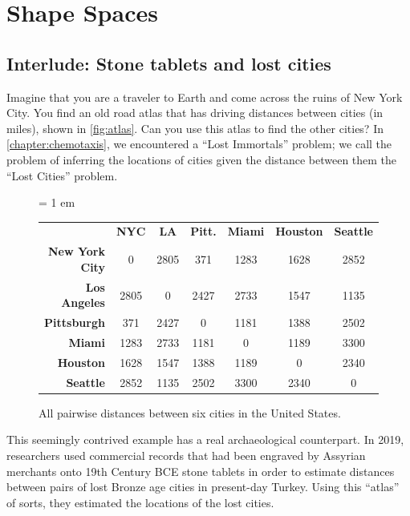 \FloatBarrier
{}

\section{Shape Spaces}
\label{sec:shape_spaces}

\subsection{Interlude: Stone tablets and lost cities}

Imagine that you are a traveler to Earth and come across the ruins of New York City. You find an old road atlas that has driving distances between cities (in miles), shown in \autoref{fig:atlas}. Can you use this atlas to find the other cities? In \autoref{chapter:chemotaxis}, we encountered a ``Lost Immortals'' problem; we call the problem of inferring the locations of cities given the distance between them the ``Lost Cities'' problem.

\begin{figure}[h]
\centering
\tabcolsep = 1 em
\mySfFamily
\begin{tabular}{r c c c c c c}
& \textbf{NYC} & \textbf{LA} & \textbf{Pitt.} & \textbf{Miami} & \textbf{Houston} & \textbf{Seattle} \\
\textbf{New York City} & 0 & 2805 & 371 & 1283 & 1628 & 2852 \\
\textbf{Los Angeles} & 2805 & 0 & 2427 & 2733 & 1547 & 1135 \\
\textbf{Pittsburgh} & 371 & 2427 & 0 & 1181 & 1388 & 2502 \\
\textbf{Miami} & 1283 & 2733 & 1181 & 0 & 1189 & 3300 \\
\textbf{Houston} & 1628 & 1547 & 1388 & 1189 & 0 & 2340 \\
\textbf{Seattle} & 2852 & 1135 & 2502 & 3300 & 2340 & 0 \\
\end{tabular}
\caption{All pairwise distances between six cities in the United States.}
\label{fig:atlas}
\end{figure}

\begin{qbox}\end{qbox}

This seemingly contrived example has a real archaeological counterpart. In 2019, researchers used commercial records that had been engraved by Assyrian merchants onto 19th Century BCE stone tablets in order to estimate distances between pairs of lost Bronze age cities in present-day Turkey. Using this ``atlas'' of sorts, they estimated the locations of the lost cities.

